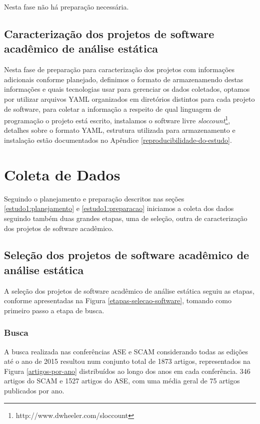 Nesta fase não há preparação necessária.


\subsection{Caracterização dos projetos de software acadêmico de análise estática} %

Nesta fase de preparação para caracterização dos projetos com informações
adicionais conforme planejado, definimos o formato de armazenamendo destas
informações e quais tecnologias usar para gerenciar os dados coletados, optamos
por utilizar arquivos YAML organizados em diretórios distintos para cada
projeto de software, para coletar a informação a respeito de qual linguagem de
programação o projeto está escrito, instalamos o software livre {\it
sloccount}\footnote{http://www.dwheeler.com/sloccount}, detalhes sobre o
formato YAML, estrutura utilizada para armazenamento e instalação estão
documentados no Apêndice \ref{reproducibilidade-do-estudo}.


\section{Coleta de Dados} \label{estudo1:coleta}

Seguindo o planejamento e preparação descritos nas seções
\ref{estudo1:planejamento} e \ref{estudo1:preparacao} iniciamos a coleta dos
dados seguindo também duas grandes etapas, uma de seleção, outra de
caracterização dos projetos de software acadêmico.

\subsection{Seleção dos projetos de software acadêmico de análise estática} %

A seleção dos projetos de software acadêmico de análise estática seguiu
as etapas, conforme apresentadas na Figura \ref{etapas-selecao-software}, tomando
como primeiro passo a etapa de busca.

\subsubsection{Busca}

A busca realizada nas conferências ASE e SCAM considerando todas as edições até
o ano de 2015 resultou num conjunto total de 1873 artigos, representados na
Figura \ref{artigos-por-ano} distribuídos ao longo dos anos em cada conferência.
346 artigos do SCAM e 1527 artigos do ASE,
com uma média geral de 75 artigos publicados por ano. 

